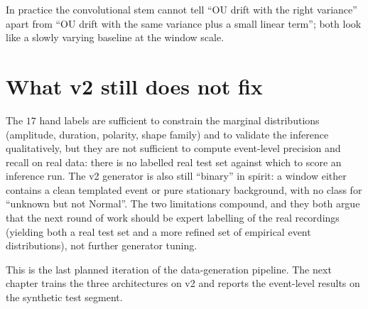 In practice the convolutional stem cannot tell ``OU drift with the
right variance'' apart from ``OU drift with the same variance plus a
small linear term''; both look like a slowly varying baseline at the
window scale.

\section{What v2 still does not fix}
\label{sec:v2-remaining}

The $17$ hand labels are sufficient to constrain the marginal
distributions (amplitude, duration, polarity, shape family) and to
validate the inference qualitatively, but they are not sufficient to
compute event-level precision and recall on real data: there is no
labelled real test set against which to score an inference run. The
v2 generator is also still ``binary'' in spirit: a window either
contains a clean templated event or pure stationary background, with
no class for ``unknown but not Normal''. The two limitations
compound, and they both argue that the next round of work should be
expert labelling of the real recordings (yielding both a real test
set and a more refined set of empirical event distributions), not
further generator tuning.

This is the last planned iteration of the data-generation pipeline.
The next chapter trains the three architectures on v2 and reports the
event-level results on the synthetic test segment.
